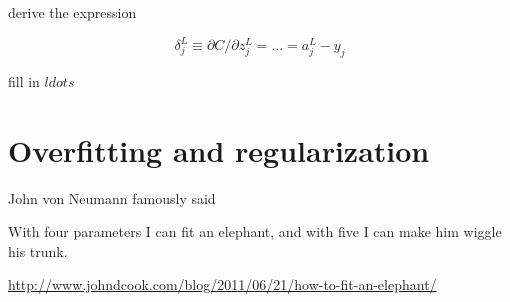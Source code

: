 \documentclass[]{book}
\begin{document}
derive the expression

\begin{equation}
\delta^L_j \equiv \partial C / \partial z^L_j = \ldots = a^L_j -y_j
\end{equation}

fill in \(ldots\)

\section{Overfitting and
regularization}\label{overfitting-and-regularization}

John von Neumann famously said

With four parameters I can fit an elephant, and with five I can make him
wiggle his trunk.

\url{http://www.johndcook.com/blog/2011/06/21/how-to-fit-an-elephant/}
\end{document}
